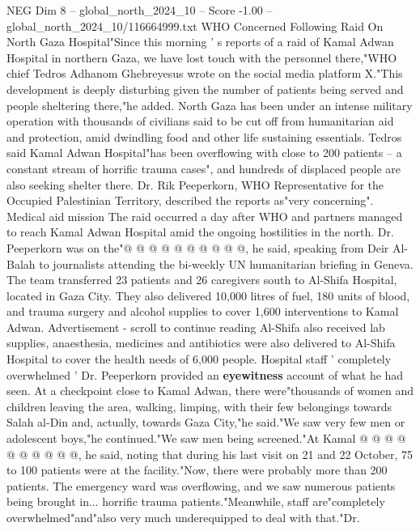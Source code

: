 \begin{textsample}{NEG Dim 8 – global\_north\_2024\_10 – Score -1.00 – global\_north\_2024\_10/116664999.txt}  \label{ex:f8_neg_291}
WHO Concerned Following Raid On North Gaza Hospital"Since this morning ' s reports of a raid of Kamal Adwan Hospital in northern Gaza, we have lost touch with the personnel there,"WHO chief Tedros Adhanom Ghebreyesus wrote on the social media platform X."This development is deeply disturbing given the number of patients being served and people sheltering there,"he added.
North Gaza has been under an intense military operation with thousands of civilians said to be cut off from humanitarian aid and protection, amid dwindling food and other life sustaining essentials.
Tedros said Kamal Adwan Hospital"has been overflowing with close to 200 patients -- a constant stream of horrific trauma cases", and hundreds of displaced people are also seeking shelter there.
Dr.
Rik Peeperkorn, WHO Representative for the Occupied Palestinian Territory, described the reports as"very concerning".
Medical aid mission The raid occurred a day after WHO and partners managed to reach Kamal Adwan Hospital amid the ongoing hostilities in the north.
Dr.
Peeperkorn was on the"@ @ @ @ @ @ @ @ @ @, he said, speaking from Deir Al-Balah to journalists attending the bi-weekly UN humanitarian briefing in Geneva.
The team transferred 23 patients and 26 caregivers south to Al-Shifa Hospital, located in Gaza City.
They also delivered 10,000 litres of fuel, 180 units of blood, and trauma surgery and alcohol supplies to cover 1,600 interventions to Kamal Adwan.
Advertisement - scroll to continue reading Al-Shifa also received lab supplies, anaesthesia, medicines and antibiotics were also delivered to Al-Shifa Hospital to cover the health needs of 6,000 people.
Hospital staff ' completely overwhelmed ' Dr.
Peeperkorn provided an \textbf{eyewitness} account of what he had seen.
At a checkpoint close to Kamal Adwan, there were"thousands of women and children leaving the area, walking, limping, with their few belongings towards Salah al-Din and, actually, towards Gaza City,"he said."We saw very few men or adolescent boys,"he continued."We saw men being screened."At Kamal @ @ @ @ @ @ @ @ @ @, he said, noting that during his last visit on 21 and 22 October, 75 to 100 patients were at the facility."Now, there were probably more than 200 patients.
The emergency ward was overflowing, and we saw numerous patients being brought in... horrific trauma patients."Meanwhile, staff are"completely overwhelmed"and"also very much underequipped to deal with that."Dr.

\end{textsample}
